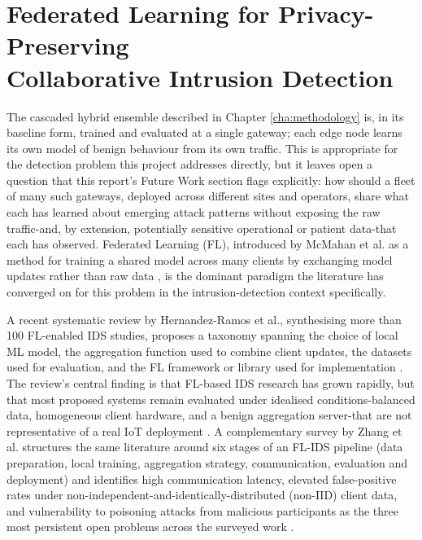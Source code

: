 \section[Federated Intrusion Detection]{Federated Learning for Privacy-Preserving\\Collaborative Intrusion Detection}

The cascaded hybrid ensemble described in Chapter \ref{cha:methodology} is, in its baseline form, trained and evaluated at a single gateway; each edge node learns its own model of benign behaviour from its own traffic. This is appropriate for the detection problem this project addresses directly, but it leaves open a question that this report's Future Work section flags explicitly: how should a fleet of many such gateways, deployed across different sites and operators, share what each has learned about emerging attack patterns without exposing the raw traffic-and, by extension, potentially sensitive operational or patient data-that each has observed. Federated Learning (FL), introduced by McMahan et al. as a method for training a shared model across many clients by exchanging model updates rather than raw data \cite{McMahan2017}, is the dominant paradigm the literature has converged on for this problem in the intrusion-detection context specifically.

A recent systematic review by Hernandez-Ramos et al., synthesising more than 100 FL-enabled IDS studies, proposes a taxonomy spanning the choice of local ML model, the aggregation function used to combine client updates, the datasets used for evaluation, and the FL framework or library used for implementation \cite{HernandezRamos2025}. The review's central finding is that FL-based IDS research has grown rapidly, but that most proposed systems remain evaluated under idealised conditions-balanced data, homogeneous client hardware, and a benign aggregation server-that are not representative of a real IoT deployment \cite{HernandezRamos2025}. A complementary survey by Zhang et al. structures the same literature around six stages of an FL-IDS pipeline (data preparation, local training, aggregation strategy, communication, evaluation and deployment) and identifies high communication latency, elevated false-positive rates under non-independent-and-identically-distributed (non-IID) client data, and vulnerability to poisoning attacks from malicious participants as the three most persistent open problems across the surveyed work \cite{Zhang2025}.

